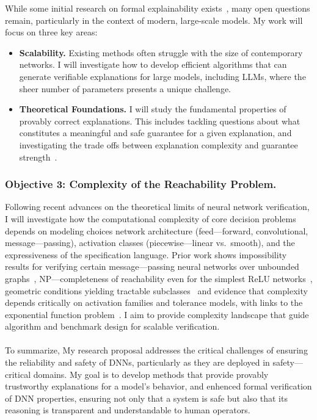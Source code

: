 \documentclass{llncs}
\begin{document}
While some initial research on formal explainability exists~\cite{Carter2019SIS,MarquesSilvaIgnatiev2022FormalXAI,BassanKatz2023FormalXAI,WuWuBarrett2023VeriX},
many open questions remain, particularly in the context of modern, 
large-scale models. My work will focus on three key areas:
\begin{itemize}
  \item \textbf{Scalability.} Existing methods often struggle with the size of contemporary networks. 
  I will investigate how to develop efficient algorithms that can generate verifiable explanations for large models, 
  including LLMs, where the sheer number of parameters presents a unique challenge. 
  \item \textbf{Theoretical Foundations.} I will study the fundamental properties of provably correct explanations. 
  This includes tackling questions about what constitutes a meaningful and safe guarantee for a given explanation, 
  and investigating the trade offs between explanation complexity and 
  guarantee strength~\cite{MarquesSilvaIgnatiev2022FormalXAI,BassanKatz2023FormalXAI,WuWuBarrett2023VeriX}.  
\end{itemize}

\subsubsection{Objective 3: Complexity of the Reachability Problem.} 
Following recent advances on the theoretical limits of neural network verification, 
I will investigate how the computational complexity of core decision problems
depends on modeling choices network architecture (feed---forward, convolutional, message---passing), 
activation classes (piecewise---linear vs.\ smooth), and the expressiveness of the specification language. 
Prior work shows impossibility results for verifying certain message---passing 
neural networks over unbounded graphs~\cite{SaLa23}, NP---completeness of reachability even for the simplest 
ReLU networks~\cite{SaLa21}, geometric conditions yielding tractable subclasses~\cite{FeSh21} 
and evidence that complexity depends critically on activation families and tolerance models, 
with links to the exponential function problem~\cite{Wu23,IsZoBaKa23}. 
I aim to provide complexity landscape that guide algorithm and benchmark design for scalable verification.

\paragraph{}
To summarize, My research proposal addresses the critical challenges of ensuring the reliability and safety of DNNs, 
particularly as they are deployed in safety---critical domains. 
My goal is to develop methods that provide provably trustworthy explanations for a model's behavior, 
and enhenced formal verification of DNN properties, ensuring not only that a system is safe 
but also that its reasoning is transparent and understandable to human operators.


\end{document}
